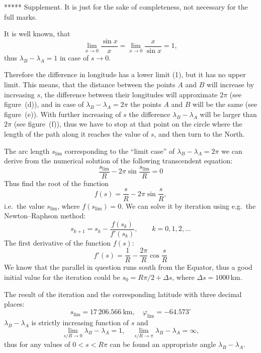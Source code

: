 \begin{description}
  ***** Supplement. It is just for the sake of completeness, not necessary for
  the full marks.

  It is well known, that
  \[
    \lim_{x\to 0}\frac{\sin x}{x} = \lim_{x\to 0}\frac{x}{\sin x} = 1,
    \tag{10.8}
  \]
  thus $\lambda_B - \lambda_A = 1$ in case of $s \to 0$.

  Therefore the difference in longitude has a lower limit (1), but it has no
  upper limit. This means, that the distance between the points $A$ and $B$
  will increase by increasing $s$, the difference between their longitudes will
  approximate $2\pi$ (see figure~(d)), and in case of
  $\lambda_B - \lambda_A = 2\pi$ the points $A$ and $B$ will be the same (see
  figure~(e)). With further increasing of $s$ the difference
  $\lambda_B - \lambda_A$ will be larger than $2\pi$ (see figure~(f)), thus we
  have to stop at that point on the circle where the length of the path along
  it reaches the value of $s$, and then turn to the North.


  The arc length $s_{\lim}$ corresponding to the ``limit case'' of
  $\lambda_B - \lambda_A = 2\pi$ we can derive from the numerical solution of
  the following transcendent equation:
  \[
    \frac{s_{\lim}}{R} - 2\pi\sin\frac{s_{\lim}}{R} = 0
  \]
  Thus find the root of the function
  \[
    f(s) = \frac{s}{R} - 2\pi\sin\frac{s}{R},
  \]
  i.e.\ the value $s_{\lim}$, where $f(s_{\lim}) = 0$. We can solve it by
  iteration using e.g.\ the Newton--Raphson method:
  \[
    s_{k+1} = s_k - \frac{f(s_k)}{f'(s_k)}, \qquad k = 0, 1, 2, \ldots
  \]
  The first derivative of the function $f(s)$:
  \[
    f'(s) = \frac{1}{R} - \frac{2\pi}{R}\cos\frac{s}{R}
  \]
  We know that the parallel in question runs south from the Equator, thus a
  good initial value for the iteration could be $s_0 = R\pi/2 + \Delta s$,
  where $\Delta s = 1000$\,km.

  The result of the iteration and the corresponding latitude with three decimal
  places:
  \[
    s_{\lim} = 17\,206.566\ \mathrm{km}, \quad
    \varphi_{\lim} = -64.573^\circ
  \]
  $\lambda_B - \lambda_A$ is strictly increasing function of $s$ and
  \[
    \lim_{s/R\to 0} \lambda_B - \lambda_A = 1, \quad
    \lim_{s/R\to \pi} \lambda_B - \lambda_A = \infty, \tag{10.9}
  \]
  thus for any values of $0 < s < R\pi$ can be found an appropriate angle
  $\lambda_B - \lambda_A$.


\end{description}
